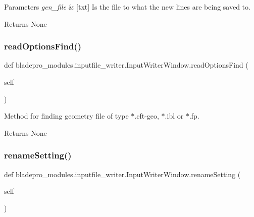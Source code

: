 \begin{DoxyParams}{Parameters}
{\em gen\+\_\+file} & \mbox{[}txt\mbox{]} Is the file to what the new lines are being saved to. \\
\hline
\end{DoxyParams}
\begin{DoxyReturn}{Returns}
None 
\end{DoxyReturn}
\hypertarget{classbladepro__modules_1_1inputfile__writer_1_1_input_writer_window_a3b0f9f0d1af5015219f258ad0751c778}{}\label{classbladepro__modules_1_1inputfile__writer_1_1_input_writer_window_a3b0f9f0d1af5015219f258ad0751c778} 
\subsubsection{\texorpdfstring{read\+Options\+Find()}{readOptionsFind()}}
{\footnotesize\ttfamily def bladepro\+\_\+modules.\+inputfile\+\_\+writer.\+Input\+Writer\+Window.\+read\+Options\+Find (\begin{DoxyParamCaption}\item[{}]{self }\end{DoxyParamCaption})}



Method for finding geometry file of type $\ast$.cft-\/geo, $\ast$.ibl or $\ast$.fp. 

\begin{DoxyReturn}{Returns}
None 
\end{DoxyReturn}
\hypertarget{classbladepro__modules_1_1inputfile__writer_1_1_input_writer_window_a464a8ac16bcb67d41a6d91ee8b51acf2}{}\label{classbladepro__modules_1_1inputfile__writer_1_1_input_writer_window_a464a8ac16bcb67d41a6d91ee8b51acf2} 
\subsubsection{\texorpdfstring{rename\+Setting()}{renameSetting()}}
{\footnotesize\ttfamily def bladepro\+\_\+modules.\+inputfile\+\_\+writer.\+Input\+Writer\+Window.\+rename\+Setting (\begin{DoxyParamCaption}\item[{}]{self }\end{DoxyParamCaption})}



